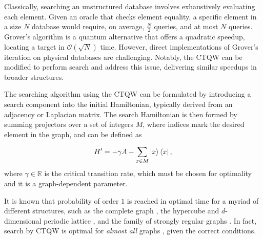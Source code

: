\documentclass[main.tex]{subfiles}
\begin{document}
Classically, searching an unstructured database involves exhaustively
evaluating each element. Given an oracle that checks element equality, a
specific element in a size \( N \) database would require, on average,
$\frac{N}{2}$ queries, and at most $N$ queries. Grover's algorithm
\cite{grover1996} is a quantum alternative that offers a quadratic speedup,
locating a target in $\mathcal{O}(\sqrt{N})$ time. However, direct
implementations of Grover's iteration on physical databases are challenging.
Notably, the CTQW can be modified to perform search \cite{farhi1996} and
address this issue, delivering similar speedups in broader structures.

The searching algorithm using the CTQW can be formulated by introducing a
search component into the initial Hamiltonian, typically derived from an
adjacency or Laplacian matrix. The search Hamiltonian is then formed by summing
projectors over a set of integers $M$, where indices mark the desired
element in the graph, and can be defined as

\begin{equation}
    H^\prime = -\gamma A - \sum_{x \in M} \ket{x}\bra{x},
    \label{eq:searchHamiltonian}
\end{equation}
where $\gamma \in \mathbb{R}$ is the critical transition rate, which must be
chosen for optimality and it is a graph-dependent parameter.

It is known that probability of order $1$ is reached in optimal time for a
myriad of different structures, such as the complete graph \cite{farhi1996},
the hypercube and $d$-dimensional periodic lattice \cite{childs2004}, and the
family of strongly regular graphs \cite{Janmark2014}. In fact, search by CTQW
is optimal for \textit{almost all} graphs \cite{chakraborty2016}, given the
correct conditions.\par
\end{document}
